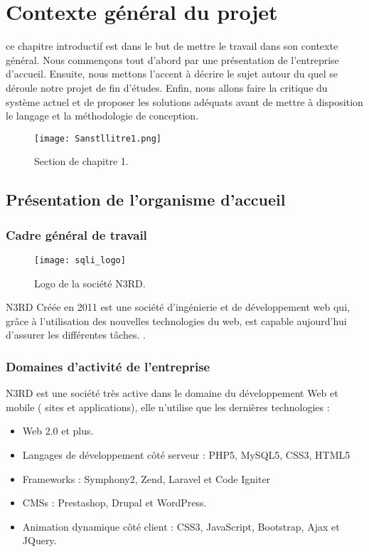 \chapter{Contexte général du projet}
\label{chap:premierchapitre}

\begin{fquote}ce chapitre introductif est dans le but de mettre le travail dans son contexte général.
	Nous commençons tout d’abord par une présentation de l’entreprise d’accueil. Ensuite, nous
	mettons l’accent à décrire le sujet autour du quel se déroule notre projet de fin d’études. Enfin,
	nous allons faire la critique du système actuel et de proposer les solutions adéquats avant de
	mettre à disposition le langage et la méthodologie de conception.
 \end{fquote}
\begin{figure}[ht]
	\centering
	\texttt{[image: Sanstllitre1.png]}
	\caption{Section de chapitre 1.}
	\label{fig:Section de chapitre 1}
\end{figure}
\FloatBarrier
\clearpage
\section{Présentation de l’organisme d’accueil}

\subsection{Cadre général de travail}

\begin{figure}[hbt!]
  \centering
  \texttt{[image: sqli\_logo]}
  \caption{Logo de la société N3RD.}
  \label{fig:logo-sqli}
\end{figure}
N3RD Créée en 2011 est une société d’ingénierie et de développement web qui, grâce à
l’utilisation des nouvelles technologies du web, est capable aujourd’hui d’assurer les différentes
tâches. \cite{wiki:sqli}.
\smallskip
\subsection{Domaines d’activité de l'entreprise}
N3RD est une société très active dans le domaine du développement Web et mobile ( sites
et applications), elle n’utilise que les dernières technologies :
\medskip
\begin{itemize}
  \item Web 2.0 et plus.
  \smallskip
  \item  Langages de développement côté serveur : PHP5, MySQL5, CSS3, HTML5
  \smallskip
  \item  Frameworks : Symphony2, Zend, Laravel et Code Igniter
  \smallskip
  \item CMSs : Prestashop, Drupal et WordPress.
  \smallskip
    \item Animation dynamique côté client : CSS3, JavaScript, Bootstrap, Ajax et JQuery.
  \smallskip
\end{itemize}
\medskip
